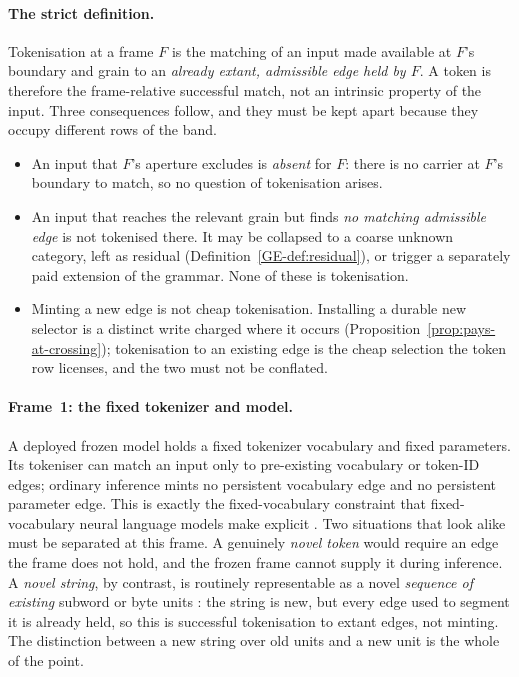 \documentclass[11pt,a4paper]{article}
\theoremstyle{remark}\newtheorem{remark}[definition]{Remark}
\begin{document}
\paragraph{The strict definition.} Tokenisation at a frame $F$ is the matching of
an input made available at $F$'s boundary and grain to an \emph{already extant,
admissible edge held by $F$}. A token is therefore the frame-relative successful
match, not an intrinsic property of the input. Three consequences follow, and
they must be kept apart because they occupy different rows of the band.
\begin{itemize}[leftmargin=*]
\item An input that $F$'s aperture excludes is \emph{absent} for $F$: there is no
carrier at $F$'s boundary to match, so no question of tokenisation arises.
\item An input that reaches the relevant grain but finds \emph{no matching
admissible edge} is not tokenised there. It may be collapsed to a coarse unknown
category, left as residual (Definition~\ref{GE-def:residual}), or trigger a
separately paid extension of the grammar. None of these is tokenisation.
\item Minting a new edge is not cheap tokenisation. Installing a durable new
selector is a distinct write charged where it occurs
(Proposition~\ref{prop:pays-at-crossing}); tokenisation to an existing edge is
the cheap selection the token row licenses, and the two must not be conflated.
\end{itemize}

\paragraph{Frame~1: the fixed tokenizer and model.} A deployed frozen model holds
a fixed tokenizer vocabulary and fixed parameters. Its tokeniser can match an
input only to pre-existing vocabulary or token-ID edges; ordinary inference mints
no persistent vocabulary edge and no persistent parameter edge. This is exactly
the fixed-vocabulary constraint that fixed-vocabulary neural language models make
explicit \citep{bengio2003}. Two situations that look alike must be separated at
this frame. A genuinely \emph{novel token} would require an edge the frame does
not hold, and the frozen frame cannot supply it during inference. A \emph{novel
string}, by contrast, is routinely representable as a novel \emph{sequence of
existing} subword or byte units \citep{sennrich2016,kudo2018,radford2019}: the
string is new, but every edge used to segment it is already held, so this is
successful tokenisation to extant edges, not minting. The distinction between a
new string over old units and a new unit is the whole of the point.
\end{document}
